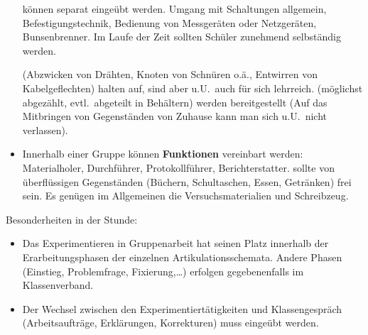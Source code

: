 \begin{itemize}
\begin{itemize}
	\end{itemize}
	
	 k\"{o}nnen separat einge\"{u}bt werden.
	Umgang mit Schaltungen allgemein, Befestigungstechnik,
	Bedienung von Messger\"{a}ten oder Netzger\"{a}ten, Bunsenbrenner.
	Im Laufe der Zeit sollten Sch\"{u}ler zunehmend selbst\"{a}ndig werden.
	
	 (Abzwicken von Dr\"{a}hten,
	Knoten von Schn\"{u}ren o.\"{a}., Entwirren von Kabelgeflechten)
	halten auf, sind aber u.U.\ auch f\"{u}r sich lehrreich.
	 (m\"{o}glichst abgez\"{a}hlt, evtl.\ abgeteilt in Beh\"{a}ltern)
	werden bereitgestellt
	(Auf das Mitbringen von Gegenst\"{a}nden von Zuhause kann man sich u.U.\
	nicht verlassen).
	\item
	Innerhalb einer Gruppe k\"{o}nnen \textbf{Funktionen} vereinbart werden:
	Materialholer, Durchf\"{u}hrer, Protokollf\"{u}hrer, Berichterstatter.
	\bitem{Arbeitsplatz} sollte von \"{u}berfl\"{u}ssigen Gegenst\"{a}nden (B\"{u}chern,
	Schultaschen, Essen, Getr\"{a}nken) frei sein.
	Es gen\"{u}gen im Allgemeinen die Versuchsmaterialien und Schreibzeug.
\end{itemize}
	
Besonderheiten in der Stunde:
\begin{itemize}
	\item
	Das Experimentieren in Gruppenarbeit hat seinen Platz innerhalb der
	Erarbeitungsphasen der einzelnen Artikulationsschemata.
	Andere Phasen (Einstieg, Problemfrage, Fixierung,\dots)
	erfolgen gegebenenfalls im Klassenverband.
	\item
	Der Wechsel zwischen den Experimentiert\"{a}tigkeiten und
	Klassengespr\"{a}ch (Arbeitsauftr\"{a}ge, Erkl\"{a}rungen, Korrekturen)
	muss einge\"{u}bt werden.
\end{itemize}

\bip\bip
